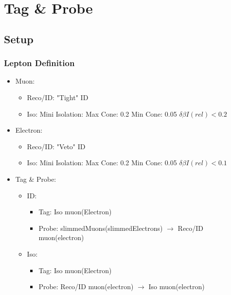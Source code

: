 \documentclass{beamer}
\begin{document}
\section{Tag \& Probe}
\subsection{Setup}
\begin{frame}
\frametitle{Lepton Definition}
\begin{itemize}
 \item Muon:
 \begin{itemize}
  \item Reco/ID: "Tight" ID
  \item Iso: Mini Isolation: Max Cone: 0.2 Min Cone: 0.05 $\delta \beta I(rel)<0.2$
 \end{itemize}
  \item Electron:
 \begin{itemize}
  \item Reco/ID: "Veto" ID
  \item Iso: Mini Isolation: Max Cone: 0.2 Min Cone: 0.05 $\delta \beta I(rel)<0.1$
 \end{itemize}
 \item Tag \& Probe:
 \begin{itemize}
 \item ID:
 \begin{itemize}
  \item Tag: Iso muon(Electron)
  \item Probe: slimmedMuons(slimmedElectrons) $\rightarrow$ Reco/ID muon(electron)
 \end{itemize}
  \item Iso:
 \begin{itemize}
  \item Tag: Iso muon(Electron)
  \item Probe: Reco/ID muon(electron) $\rightarrow$ Iso muon(electron)
 \end{itemize}

 \end{itemize}
\end{itemize}
\end{frame}
\end{document}
